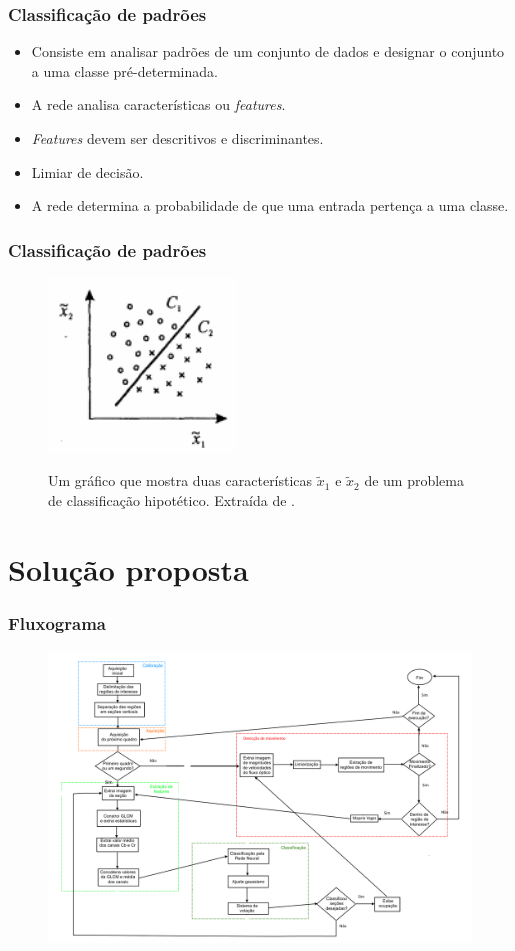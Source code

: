 \documentclass{beamer}
\begin{document}
\begin{frame}
\frametitle{Classificação de padrões}
\begin{itemize}
\item Consiste em analisar padrões de um conjunto de dados e designar o conjunto a uma classe pré-determinada.
\item A rede analisa características ou \textit{features}.
\item \textit{Features} devem ser descritivos e discriminantes.
\item Limiar de decisão.
\item A rede determina a probabilidade de que uma entrada pertença a uma classe.
\end{itemize}
\end{frame}

\begin{frame}
\frametitle{Classificação de padrões}
\begin{figure}
\centering
\includegraphics[width=5cm]{features}
\label{fig:features}
\caption{Um gráfico que mostra duas características $\tilde{x}_1$ e $\tilde{x}_2$ de um problema de classificação hipotético. Extraída de \cite{NNForPR}.}
\end{figure}
\end{frame}


\section{Solução proposta}

\begin{frame}
\frametitle{Fluxograma}
\begin{figure}
	\centering
	\includegraphics[width=1\textwidth, height=.8\textheight]{fluxograma}
	\centering
\end{figure}
\end{frame}
\end{document}
